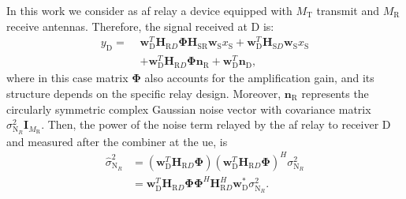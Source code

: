 In this work we consider as \gls{af} relay a device equipped with $M_{\mathrm T}$ transmit and $M_{\mathrm R}$ receive antennas.
Therefore, the signal received at D is:
\begin{align}
\label{eq:af_iput_output}
    y_{\mathrm D} = \,\, &\bm{w}_{\mathrm D}^{T} \bm{H}_{\mathrm RD} \bm{\Phi} \bm{H}_{\mathrm {SR}} \bm{w}_{\mathrm S} x_{\mathrm S} + \bm{w}_{\mathrm D}^{T} \bm{H}_{\mathrm SD} \bm{w}_{\mathrm S} x_{\mathrm S}  \nonumber \\
   &+ \bm{w}_{\mathrm D}^{T} \bm{H}_{\mathrm RD} \bm{\Phi} \bm{n}_{\mathrm R} + \bm{w}_{\mathrm D}^{T} \bm{n}_{\mathrm D},
\end{align}
where in this case matrix $\bm{\Phi}$ also accounts for the amplification gain, and its structure depends on the specific relay design.
Moreover, $\bm{n}_{\mathrm R}$ represents the circularly symmetric complex Gaussian noise vector with covariance matrix $\sigma_{\mathrm N_R}^2 \bm{I}_{M_{\mathrm R}} $.
Then, the power of the noise term relayed by the \gls{af} relay to receiver D and measured after the combiner at the \gls{ue}, is
\begin{equation} 
\label{eq:af_noise_power}
    \begin{split}
        \hat{\sigma}_{\mathrm N_R}^2 &= \left( \bm{w}_{\mathrm D}^{T} \bm{H}_{\mathrm RD} \bm{\Phi} \right) \left( \bm{w}_{\mathrm D}^{T} \bm{H}_{\mathrm RD} \bm{\Phi} \right)^{H} \sigma_{\mathrm N_R}^2 \\
         & = \bm{w}_{\mathrm D}^{T} \bm{H}_{\mathrm RD} \bm{\Phi} \bm{\Phi}^{H} \bm{H}_{\mathrm RD}^{H} {\bm w}^{*}_{\mathrm D} \sigma_{\mathrm N_R}^2.
    \end{split}
\end{equation}

